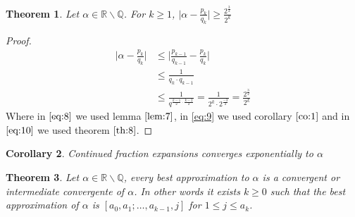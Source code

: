 \documentclass[a4paper,11pt,american]{article}
\newcommand{\Q}{\mathbb{Q}}
\newcommand{\R}{\mathbb{R}}
\theoremstyle{plain}
\newtheorem{theorem}{Theorem}
\newtheorem{corollary}[theorem]{Corollary}
\theoremstyle{definition}
\begin{document}
\begin{theorem}
    Let $\alpha\in\R\backslash\Q$. For $k\geq 1$, $\vert\alpha-\frac{p_k}{q_k}\vert\geq \frac{2^\frac{3}{2}}{2^k}$
\end{theorem}
\begin{proof}
    \begin{align}
        \vert\alpha-\frac{p_k}{q_k}\vert&\leq\vert \frac{p_{k-1}}{q_{k-1}}-\frac{p_k}{q_k}\vert \label{eq:8}\\
        &\leq \frac{1}{q_k\cdot q_{k-1}}\label{eq:9}\\
        &\leq \frac{1}{q^{\frac{k-1}{2}\cdot\frac{k-2}{2}}}=\frac{1}{2^k\cdot2^\frac{-3}{2}}=\frac{2^\frac{3}{2}}{2^k}\label{eq:10}
    \end{align}
    Where in $\eqref{eq:8}$ we used lemma $\eqref{lem:7}$, in \eqref{eq:9} we used corollary $\eqref{co:1}$ and in $\eqref{eq:10}$ we used theorem $\eqref{th:8}$.
\end{proof}
\begin{corollary}
    Continued fraction expansions converges exponentially to $\alpha$
\end{corollary}
\begin{theorem}
    Let $\alpha\in\R\backslash\Q$, every best approximation to $\alpha$ is a convergent or intermediate convergente of $\alpha$. In other words it exists $k\geq 0$ such that the best approximation of $\alpha$ is $[a_0,a_1;\dots,a_{k-1},j]$ for $1\leq j\leq a_k$.
\end{theorem}
\end{document}
